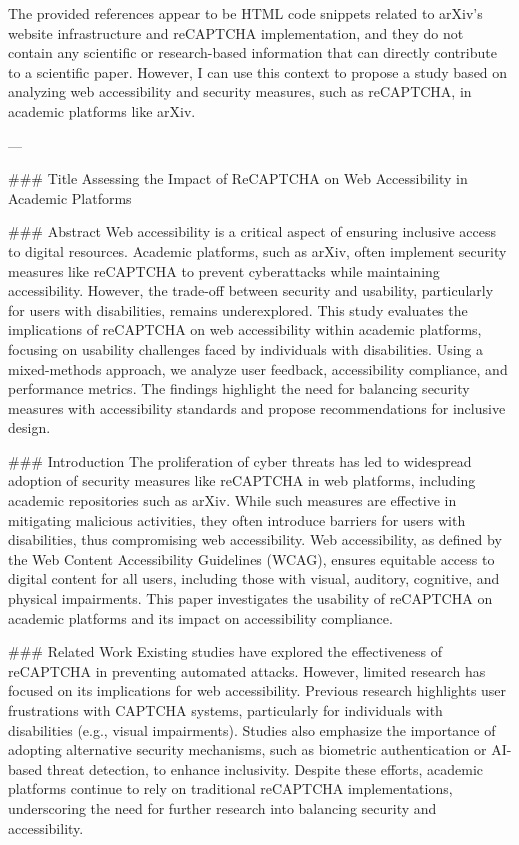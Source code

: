 The provided references appear to be HTML code snippets related to arXiv's website infrastructure and reCAPTCHA implementation, and they do not contain any scientific or research-based information that can directly contribute to a scientific paper. However, I can use this context to propose a study based on analyzing web accessibility and security measures, such as reCAPTCHA, in academic platforms like arXiv. 

---

### Title
Assessing the Impact of ReCAPTCHA on Web Accessibility in Academic Platforms

### Abstract
Web accessibility is a critical aspect of ensuring inclusive access to digital resources. Academic platforms, such as arXiv, often implement security measures like reCAPTCHA to prevent cyberattacks while maintaining accessibility. However, the trade-off between security and usability, particularly for users with disabilities, remains underexplored. This study evaluates the implications of reCAPTCHA on web accessibility within academic platforms, focusing on usability challenges faced by individuals with disabilities. Using a mixed-methods approach, we analyze user feedback, accessibility compliance, and performance metrics. The findings highlight the need for balancing security measures with accessibility standards and propose recommendations for inclusive design.

### Introduction
The proliferation of cyber threats has led to widespread adoption of security measures like reCAPTCHA in web platforms, including academic repositories such as arXiv. While such measures are effective in mitigating malicious activities, they often introduce barriers for users with disabilities, thus compromising web accessibility. Web accessibility, as defined by the Web Content Accessibility Guidelines (WCAG), ensures equitable access to digital content for all users, including those with visual, auditory, cognitive, and physical impairments. This paper investigates the usability of reCAPTCHA on academic platforms and its impact on accessibility compliance.

### Related Work
Existing studies have explored the effectiveness of reCAPTCHA in preventing automated attacks. However, limited research has focused on its implications for web accessibility. Previous research highlights user frustrations with CAPTCHA systems, particularly for individuals with disabilities (e.g., visual impairments). Studies also emphasize the importance of adopting alternative security mechanisms, such as biometric authentication or AI-based threat detection, to enhance inclusivity. Despite these efforts, academic platforms continue to rely on traditional reCAPTCHA implementations, underscoring the need for further research into balancing security and accessibility.

